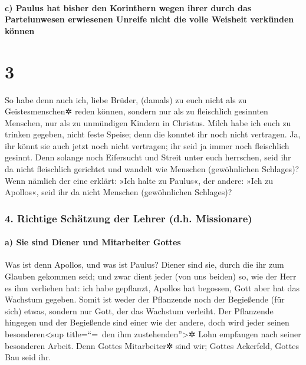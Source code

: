 \hypertarget{c-paulus-hat-bisher-den-korinthern-wegen-ihrer-durch-das-parteiunwesen-erwiesenen-unreife-nicht-die-volle-weisheit-verkuxfcnden-kuxf6nnen}{%
\paragraph{c) Paulus hat bisher den Korinthern wegen ihrer durch das
Parteiunwesen erwiesenen Unreife nicht die volle Weisheit verkünden
können}\label{c-paulus-hat-bisher-den-korinthern-wegen-ihrer-durch-das-parteiunwesen-erwiesenen-unreife-nicht-die-volle-weisheit-verkuxfcnden-kuxf6nnen}}

\hypertarget{section-2}{%
\section{3}\label{section-2}}

 So habe denn auch ich, liebe Brüder, (damals) zu euch
nicht als zu Geistesmenschen✲ reden können, sondern nur als zu
fleischlich gesinnten Menschen, nur als zu unmündigen Kindern in
Christus.  Milch habe ich euch zu trinken gegeben, nicht
feste Speise; denn die konntet ihr noch nicht vertragen. Ja, ihr könnt
sie auch jetzt noch nicht vertragen;  ihr seid ja immer
noch fleischlich gesinnt. Denn solange noch Eifersucht und Streit unter
euch herrschen, seid ihr da nicht fleischlich gerichtet und wandelt wie
Menschen (gewöhnlichen Schlages)?  Wenn nämlich der eine
erklärt: »Ich halte zu Paulus«, der andere: »Ich zu Apollos«, seid ihr
da nicht Menschen (gewöhnlichen Schlages)?

\hypertarget{richtige-schuxe4tzung-der-lehrer-d.h.-missionare}{%
\subsubsection{4. Richtige Schätzung der Lehrer (d.h.
Missionare)}\label{richtige-schuxe4tzung-der-lehrer-d.h.-missionare}}

\hypertarget{a-sie-sind-diener-und-mitarbeiter-gottes}{%
\paragraph{a) Sie sind Diener und Mitarbeiter
Gottes}\label{a-sie-sind-diener-und-mitarbeiter-gottes}}

 Was ist denn Apollos, und was ist Paulus? Diener sind
sie, durch die ihr zum Glauben gekommen seid; und zwar dient jeder (von
uns beiden) so, wie der Herr es ihm verliehen hat:  ich
habe gepflanzt, Apollos hat begossen, Gott aber hat das Wachstum
gegeben.  Somit ist weder der Pflanzende noch der
Begießende (für sich) etwas, sondern nur Gott, der das Wachstum
verleiht.  Der Pflanzende hingegen und der Begießende sind
einer wie der andere, doch wird jeder seinen besonderen\textless sup
title=``=~den ihm zustehenden''\textgreater✲ Lohn empfangen nach seiner
besonderen Arbeit.  Denn Gottes Mitarbeiter✲ sind wir;
Gottes Ackerfeld, Gottes Bau seid ihr.


